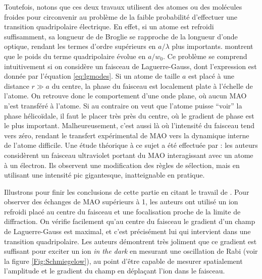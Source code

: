 Toutefois, notons que ces deux travaux utilisent des atomes ou des molécules froides pour circonvenir au problème de la faible probabilité d'effectuer une transition quadripolaire électrique. En effet, si un atome est refroidi suffisamment, sa longueur de de Broglie se rapproche de la longueur d'onde optique, rendant les termes d'ordre supérieurs en $a/\lambda$ plus importants.  montrent que le poids du terme quadripolaire évolue en $a/w_0$. Ce problème se comprend intuitivement si on considère un faisceau de Laguerre-Gauss, dont l'expression est donnée par l'équation \ref{eq:lgmodes}. Si un atome de taille $a$ est placé à une distance $r\gg a$ du centre, la phase du faisceau est localement plate à l'échelle de l'atome. On retrouve donc le comportement d'une onde plane, où aucun MAO n'est transféré à l'atome. Si au contraire on veut que l'atome puisse ``voir'' la phase hélicoïdale, il faut le placer très près du centre, où le gradient de phase est le plus important. Malheureusement, c'est aussi là où l'intensité du faisceau tend vers zéro, rendant le transfert expérimental de MAO vers la dynamique interne de l'atome difficile. Une étude théorique à ce sujet a été effectuée par  : les auteurs considèrent un faisceau ultraviolet portant du MAO interagissant avec un atome à un électron. Ils observent une modification des règles de sélection, mais en utilisant une intensité pic gigantesque, inatteignable en pratique.

Illustrons pour finir les conclusions de cette partie en citant le travail de . Pour observer des échanges de MAO supérieurs à 1, les auteurs ont utilisé un ion refroidi placé au centre du faisceau et une focalisation proche de la limite de diffraction. On vérifie facilement qu'au centre du faisceau le gradient d'un champ de Laguerre-Gauss est maximal, et c'est précisément lui qui intervient dans une transition quadripolaire. Les auteurs démontrent très joliment que ce gradient est suffisant pour exciter un ion \textit{in the dark} en mesurant une oscillation de Rabi (voir la figure \ref{Fig:Schmiegelow}), au point d'être capable de mesurer spatialement l'amplitude et le gradient du champ en déplaçant l'ion dans le faisceau.
\newpage

